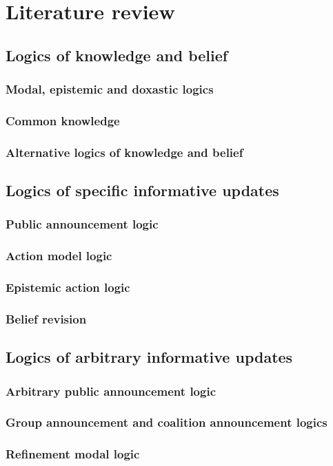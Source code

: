 \chapter{Literature review}

\section{Logics of knowledge and belief}

\subsection{Modal, epistemic and doxastic logics}

\subsection{Common knowledge}

\subsection{Alternative logics of knowledge and belief}

\section{Logics of specific informative updates}

\subsection{Public announcement logic}

\subsection{Action model logic}

\subsection{Epistemic action logic}

\subsection{Belief revision}

\section{Logics of arbitrary informative updates}

\subsection{Arbitrary public announcement logic}

\subsection{Group announcement and coalition announcement logics}

\subsection{Refinement modal logic}
